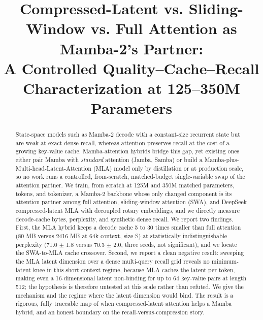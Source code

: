 \documentclass[conference]{IEEEtran}
\begin{document}
\title{Compressed-Latent vs. Sliding-Window vs. Full Attention as Mamba-2's Partner:\\
A Controlled Quality--Cache--Recall Characterization at 125--350M Parameters}

\author{
}

\maketitle

\begin{abstract}
State-space models such as Mamba-2 decode with a constant-size recurrent state but are weak at exact dense recall, whereas attention preserves recall at the cost of a growing key-value cache. Mamba-attention hybrids bridge this gap, yet existing ones either pair Mamba with \emph{standard} attention (Jamba, Samba) or build a Mamba-plus-Multi-head-Latent-Attention (MLA) model only by distillation or at production scale, so no work runs a controlled, from-scratch, matched-budget single-variable swap of the attention partner. We train, from scratch at 125M and 350M matched parameters, tokens, and tokenizer, a Mamba-2 backbone whose only changed component is its attention partner among full attention, sliding-window attention (SWA), and DeepSeek compressed-latent MLA with decoupled rotary embeddings, and we directly measure decode-cache bytes, perplexity, and synthetic dense recall. We report two findings. First, the MLA hybrid keeps a decode cache 5 to 30 times smaller than full attention (80 MB versus 2416 MB at 64k context, size-S) at statistically indistinguishable perplexity (71.0 $\pm$ 1.8 versus 70.3 $\pm$ 2.0, three seeds, not significant), and we locate the SWA-to-MLA cache crossover. Second, we report a clean negative result: sweeping the MLA latent dimension over a dense multi-query recall grid reveals no minimum-latent knee in this short-context regime, because MLA caches the latent per token, making even a 16-dimensional latent non-binding for up to 64 key-value pairs at length 512; the hypothesis is therefore untested at this scale rather than refuted. We give the mechanism and the regime where the latent dimension would bind. The result is a rigorous, fully traceable map of when compressed-latent attention helps a Mamba hybrid, and an honest boundary on the recall-versus-compression story.
\end{abstract}
\end{document}
